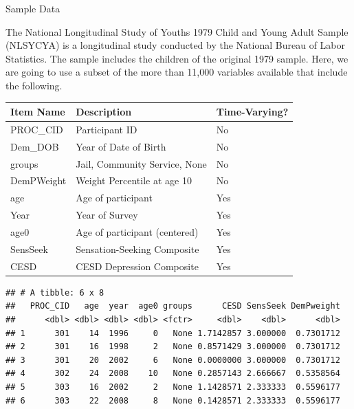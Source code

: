 \begin{frame}[fragile]{Sample Data}

The National Longitudinal Study of Youths 1979 Child and Young Adult
Sample (NLSYCYA) is a longitudinal study conducted by the National
Bureau of Labor Statistics. The sample includes the children of the
original 1979 sample. Here, we are going to use a subset of the more
than 11,000 variables available that include the following.

\begin{longtable}[]{@{}lll@{}}
\toprule
Item Name & Description & Time-Varying?\tabularnewline
\midrule
\endhead
PROC\_CID & Participant ID & No\tabularnewline
Dem\_DOB & Year of Date of Birth & No\tabularnewline
groups & Jail, Community Service, None & No\tabularnewline
DemPWeight & Weight Percentile at age 10 & No\tabularnewline
age & Age of participant & Yes\tabularnewline
Year & Year of Survey & Yes\tabularnewline
age0 & Age of participant (centered) & Yes\tabularnewline
SensSeek & Sensation-Seeking Composite & Yes\tabularnewline
CESD & CESD Depression Composite & Yes\tabularnewline
\bottomrule
\end{longtable}

\begin{Shaded}
\begin{Highlighting}[]
\NormalTok{(}\NormalTok{(}\NormalTok{, } \NormalTok{)))}

\end{Highlighting}
\end{Shaded}

\begin{verbatim}
## # A tibble: 6 x 8
##   PROC_CID   age  year  age0 groups      CESD SensSeek DemPweight
##      <dbl> <dbl> <dbl> <dbl> <fctr>     <dbl>    <dbl>      <dbl>
## 1      301    14  1996     0   None 1.7142857 3.000000  0.7301712
## 2      301    16  1998     2   None 0.8571429 3.000000  0.7301712
## 3      301    20  2002     6   None 0.0000000 3.000000  0.7301712
## 4      302    24  2008    10   None 0.2857143 2.666667  0.5358564
## 5      303    16  2002     2   None 1.1428571 2.333333  0.5596177
## 6      303    22  2008     8   None 0.1428571 2.333333  0.5596177
\end{verbatim}

\end{frame}

